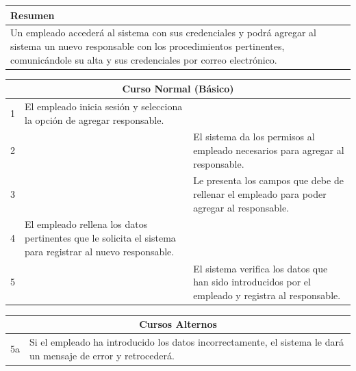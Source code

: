 \vspace{0.2cm}

\begin{table}[h!]
\centering
\begin{tabularx}{\textwidth}{|X|}
\hline
\cellcolor[HTML]{F2F2F2}\textbf{Resumen} \\ \hline
Un empleado accederá al sistema con sus credenciales y podrá agregar al sistema un nuevo responsable con los procedimientos pertinentes, comunicándole su alta y sus credenciales por correo electrónico. \\ \hline
\end{tabularx}
\end{table}

\vspace{0.2cm}

\begin{table}[h!]
\centering
\begin{tabularx}{\textwidth}{|c|X|X|}
\hline
\multicolumn{3}{|c|}{\cellcolor[HTML]{F2F2F2}\textbf{Curso Normal (Básico)}} \\ \hline
1 & El empleado inicia sesión y selecciona la opción de agregar responsable. & \\ \hline
2 & & El sistema da los permisos al empleado necesarios para agregar al responsable. \\ \hline
3 & & Le presenta los campos que debe de rellenar el empleado para poder agregar al responsable. \\ \hline
4 & El empleado rellena los datos pertinentes que le solicita el sistema para registrar al nuevo responsable. & \\ \hline
5 & & El sistema verifica los datos que han sido introducidos por el empleado y registra al responsable. \\ \hline
\end{tabularx}
\end{table}

\vspace{0.2cm}

\begin{table}[h!]
\centering
\begin{tabularx}{\textwidth}{|c|X|}
\hline
\multicolumn{2}{|c|}{\cellcolor[HTML]{F2F2F2}\textbf{Cursos Alternos}} \\ \hline
5a & Si el empleado ha introducido los datos incorrectamente, el sistema le dará un mensaje de error y retrocederá. \\ \hline
\end{tabularx}
\end{table}

